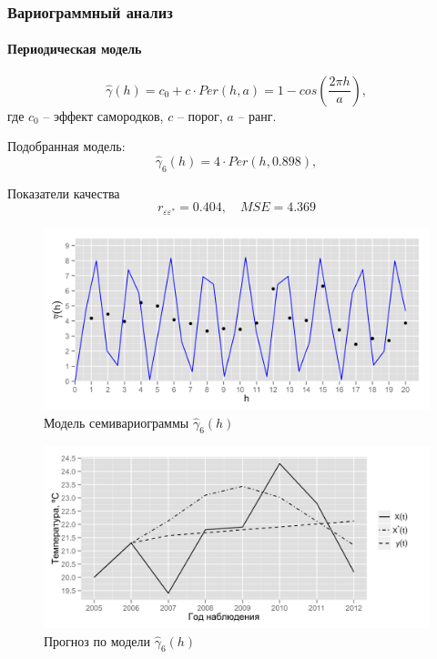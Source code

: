 \documentclass{beamer}
\begin{document}
\begin{frame}
  \frametitle{Вариограммный анализ}
  \framesubtitle{Периодическая модель}
  \begin{multicols}{2}
  \begin{equation}
  \label{eq:per}
    \widehat{\gamma}(h) = c_0 + c \cdot Per(h, a) = 1 - cos(\frac{2 \pi h}{a}),
  \end{equation}
  где $ c_0 $ -- эффект самородков, $ c $ -- порог, $ a $ -- ранг.

  \medskip

  Подобранная модель:
  \begin{equation}
  \label{eq:gamma6}
    \widehat{\gamma}_6(h) = 4 \cdot Per(h, 0.898),
  \end{equation}

  Показатели качества
  \begin{equation*}
    r_{\varepsilon\varepsilon^{*}} = 0.404, \quad MSE = 4.369
  \end{equation*}

  \columnbreak
  \vspace{-14.5pt}
  \begin{figure}[H]
    \includegraphics[width=0.9\linewidth]{../../figures/variogram/per-fit-cv-modeled.png} \\
    \caption{Модель семивариограммы $\widehat{\gamma}_6(h)$}
    \includegraphics[width=0.9\linewidth]{../../figures/variogram/per-fit-cv-cross-prediction.png}
    \caption{Прогноз по модели $\widehat{\gamma}_6(h)$}
  \end{figure}
  \end{multicols}
\end{frame}
\end{document}
